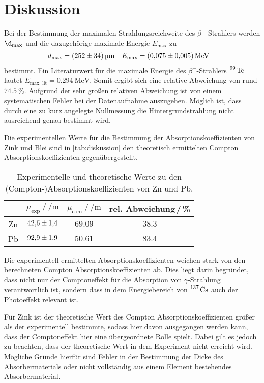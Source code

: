 \section{Diskussion}
\label{sec:Diskussion}
Bei der Bestimmung der maximalen Strahlungsreichweite des $\beta^{-}$-Strahlers werden $\d_{\text{max}}$ 
und die dazugehörige maximale Energie $E_{\text{max}}$ zu
\begin{align*}
    d_{\text{max}} &= \qty{252+-34}{\micro\metre} & E_{\text{max}} &= \qty{0.075+-0.005}{\mega\electronvolt}
\end{align*}
bestimmt. Ein Literaturwert für die maximale Energie des $\beta^{-}$-Strahlers $\ce{^99 Tc}$ lautet 
$E_{\text{max, lit}} = \qty{0,294}{\mega\electronvolt}$. Somit ergibt sich eine relative Abweichung von
rund $\qty{74,5}{\percent}$.
Aufgrund der sehr großen relativen Abweichung ist von einem systematischen Fehler bei der Datenaufnahme auszugehen.
Möglich ist, dass durch eine zu kurz angelegte Nullmessung die Hintergrundstrahlung nicht ausreichend genau 
bestimmt wird.

Die experimentellen Werte für die Bestimmung der Absorptionskoeffizienten von Zink und Blei sind in 
\autoref{tab:diskussion} den theoretisch ermittelten Compton Absorptionskoeffizienten gegenübergestellt.

\begin{table} [H]
    \centering
    \caption{Experimentelle und theoretische Werte zu den (Compton-)Absorptionskoeffizienten von Zn und Pb.}
    \label{tab:diskussion}
    \begin{tabular}{S S S S}
      \toprule
      {} & {$\mu_{\text{exp}} \mathbin{/} \unit{\per\metre}$} & {$\mu_{\text{com}} \mathbin{/} \unit{\per\metre}$} & {rel. Abweichung\,/\,\%}  \\
      \midrule
      {Zn} & $\num{42.6+-1.4}$ & $\num{69,09}$ & $\num{38,3}$ \\ 
      {Pb} & $\num{92.9+-1.9}$ & $\num{50,61}$ & $\num{83,4}$ \\
      \bottomrule
    \end{tabular}
\end{table}

Die experimentell ermittelten Absorptionskoeffizienten weichen stark von den berechneten Compton Absorptionskoeffizienten
ab. Dies liegt darin begründet, dass nicht nur der Comptoneffekt für die Absorption von $\gamma$-Strahlung verantwortlich
ist, sondern dass in dem Energiebereich von $\ce{^137 Cs}$ auch der Photoeffekt relevant ist.

Für Zink ist der theoretische Wert des Compton Absorptionskoeffizienten größer als der experimentell bestimmte, 
sodass hier davon ausgegangen werden kann, dass der Comptoneffekt hier eine übergeordnete Rolle spielt.
Dabei gilt es jedoch zu beachten, dass der theoretische Wert in dem Experiment nicht erreicht wird. Mögliche 
Gründe hierfür sind Fehler in der Bestimmung der Dicke des Absorbermaterials oder nicht vollständig aus einem 
Element bestehendes Absorbermaterial.

